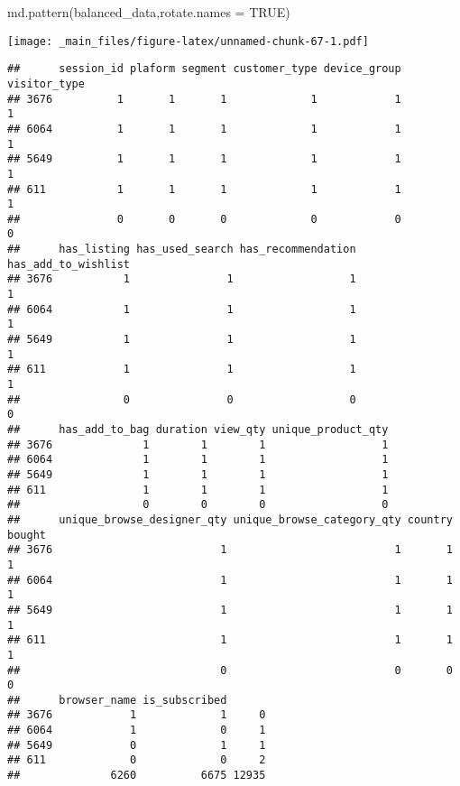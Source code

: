 \documentclass[
]{book}
\newenvironment{Shaded}{\begin{snugshade}}{\end{snugshade}}
\newcommand{\AttributeTok}[1]{\textcolor[rgb]{0.77,0.63,0.00}{#1}}
\newcommand{\ConstantTok}[1]{\textcolor[rgb]{0.00,0.00,0.00}{#1}}
\newcommand{\FunctionTok}[1]{\textcolor[rgb]{0.00,0.00,0.00}{#1}}
\newcommand{\NormalTok}[1]{#1}
\begin{document}
\begin{Shaded}
\begin{Highlighting}[]
\FunctionTok{md.pattern}\NormalTok{(balanced\_data,}\AttributeTok{rotate.names =} \ConstantTok{TRUE}\NormalTok{)}
\end{Highlighting}
\end{Shaded}

\texttt{[image: \_main\_files/figure-latex/unnamed-chunk-67-1.pdf]}

\begin{verbatim}
##      session_id plaform segment customer_type device_group visitor_type
## 3676          1       1       1             1            1            1
## 6064          1       1       1             1            1            1
## 5649          1       1       1             1            1            1
## 611           1       1       1             1            1            1
##               0       0       0             0            0            0
##      has_listing has_used_search has_recommendation has_add_to_wishlist
## 3676           1               1                  1                   1
## 6064           1               1                  1                   1
## 5649           1               1                  1                   1
## 611            1               1                  1                   1
##                0               0                  0                   0
##      has_add_to_bag duration view_qty unique_product_qty
## 3676              1        1        1                  1
## 6064              1        1        1                  1
## 5649              1        1        1                  1
## 611               1        1        1                  1
##                   0        0        0                  0
##      unique_browse_designer_qty unique_browse_category_qty country bought
## 3676                          1                          1       1      1
## 6064                          1                          1       1      1
## 5649                          1                          1       1      1
## 611                           1                          1       1      1
##                               0                          0       0      0
##      browser_name is_subscribed      
## 3676            1             1     0
## 6064            1             0     1
## 5649            0             1     1
## 611             0             0     2
##              6260          6675 12935
\end{verbatim}
\end{document}
